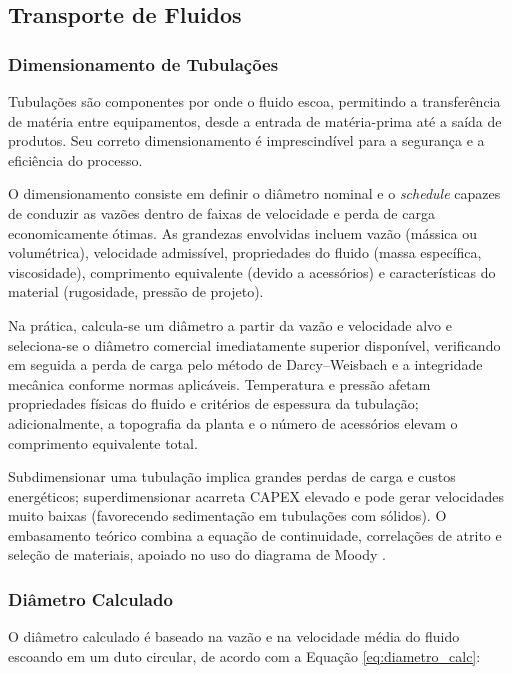 \subsection{Transporte de Fluidos}

\subsubsection{Dimensionamento de Tubulações}

Tubulações são componentes por onde o fluido escoa, permitindo a transferência de matéria entre equipamentos, desde a entrada de matéria-prima até a saída de produtos. Seu correto dimensionamento é imprescindível para a segurança e a eficiência do processo.

O dimensionamento consiste em definir o diâmetro nominal e o \textit{schedule} capazes de conduzir as vazões dentro de faixas de velocidade e perda de carga economicamente ótimas. As grandezas envolvidas incluem vazão (mássica ou volumétrica), velocidade admissível, propriedades do fluido (massa específica, viscosidade), comprimento equivalente (devido a acessórios) e características do material (rugosidade, pressão de projeto).

Na prática, calcula-se um diâmetro a partir da vazão e velocidade alvo e seleciona-se o diâmetro comercial imediatamente superior disponível, verificando em seguida a perda de carga pelo método de Darcy–Weisbach e a integridade mecânica conforme normas aplicáveis. Temperatura e pressão afetam propriedades físicas do fluido e critérios de espessura da tubulação; adicionalmente, a topografia da planta e o número de acessórios elevam o comprimento equivalente total.

Subdimensionar uma tubulação implica grandes perdas de carga e custos energéticos; superdimensionar acarreta CAPEX elevado e pode gerar velocidades muito baixas (favorecendo sedimentação em tubulações com sólidos). O embasamento teórico combina a equação de continuidade, correlações de atrito e seleção de materiais, apoiado no uso do diagrama de Moody \cite{white2018}.

\subsubsection{Diâmetro Calculado}

O diâmetro calculado é baseado na vazão e na velocidade média do fluido escoando em um duto circular, de acordo com a Equação \ref{eq:diametro_calc}:

